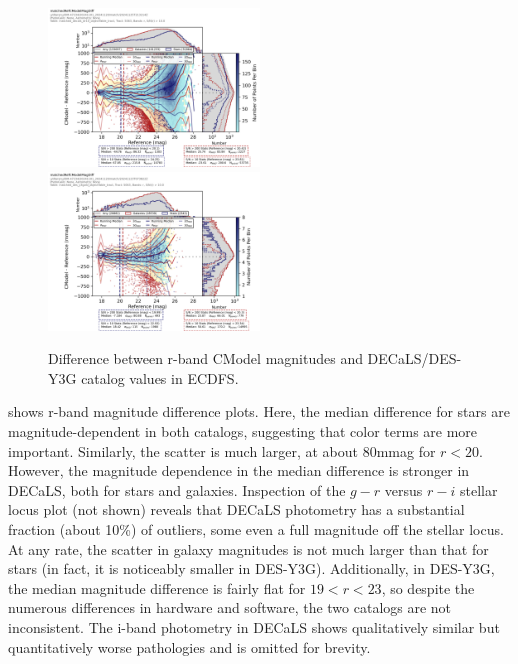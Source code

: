 \begin{figure}
  \includegraphics[width=0.5\textwidth]{galaxy_photometry/cdfs_r_vs_DECaLS.png}
  \includegraphics[width=0.5\textwidth]{galaxy_photometry/cdfs_r_vs_desy3g.png}
\caption{Difference between r-band CModel magnitudes and DECaLS/DES-Y3G catalog values in ECDFS.}
  \label{fig:cdfs_r_vs_des}
\end{figure}

 shows r-band magnitude difference plots.
Here, the median difference for stars are magnitude-dependent in both catalogs, suggesting that color terms are more important.
Similarly, the scatter is much larger, at about 80mmag for $r < 20$.
However, the magnitude dependence in the median difference is stronger in DECaLS, both for stars and galaxies.
Inspection of the $g-r$ versus $r-i$ stellar locus plot (not shown) reveals that DECaLS photometry has a substantial fraction (about 10\%) of outliers, some even a full magnitude off the stellar locus.
At any rate, the scatter in galaxy magnitudes is not much larger than that for stars (in fact, it is noticeably smaller in DES-Y3G).
Additionally, in DES-Y3G, the median magnitude difference is fairly flat for $19<r<23$, so despite the numerous differences in hardware and software, the two catalogs are not inconsistent.
The i-band photometry in DECaLS shows qualitatively similar but quantitatively worse pathologies and is omitted for brevity.

